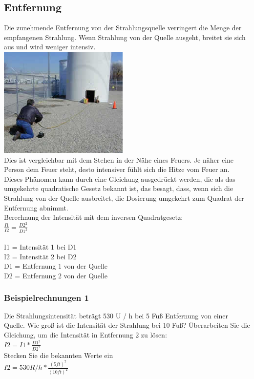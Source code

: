 \subsection{Entfernung}
Die zunehmende Entfernung von der Strahlungsquelle verringert die Menge der empfangenen Strahlung. Wenn Strahlung von der Quelle ausgeht, breitet sie sich aus und wird weniger intensiv.\\
\includegraphics[scale=0.5]{img/distance.jpg}\\
Dies ist vergleichbar mit dem Stehen in der Nähe eines Feuers. Je näher eine Person dem Feuer steht, desto intensiver fühlt sich die Hitze vom Feuer an. Dieses Phänomen kann durch eine Gleichung ausgedrückt werden, die als das umgekehrte quadratische Gesetz bekannt ist, das besagt, dass, wenn sich die Strahlung von der Quelle ausbreitet, die Dosierung umgekehrt zum Quadrat der Entfernung abnimmt.\\
Berechnung der Intensität mit dem inversen Quadratgesetz: \\

\( \frac {I1}  {I2} = \frac {D2^2} { D1^2} \) \\
\\
I1 = Intensität 1 bei D1 \\
I2 = Intensität 2 bei D2 \\
D1 = Entfernung 1 von der Quelle\\
D2 = Entfernung 2 von der Quelle\\

\subsubsection{Beispielrechnungen 1}
Die Strahlungsintensität beträgt 530 U / h bei 5 Fuß Entfernung von einer Quelle. 
Wie groß ist die Intensität der Strahlung bei 10 Fuß?
Überarbeiten Sie die Gleichung, um die Intensität in Entfernung 2 zu lösen:\\
\( I2 = I1*\frac{D1^2} { D2^2} \) \\
Stecken Sie die bekannten Werte ein\\
\( I2 = 530R/h * \frac{(5ft)^2} {(10ft)^2} \) \\

